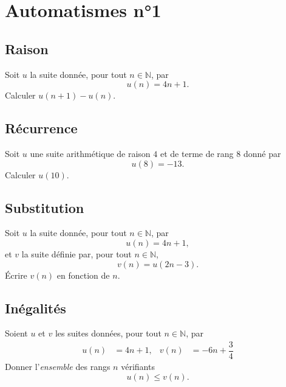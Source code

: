 \documentclass[14pt]{beamer}
\newcommand{\N}{\mathbb{N}}
\begin{document}
\section{Automatismes n°1}

\subsection{Raison}

\begin{frame}
	
	Soit $u$ la suite donnée, pour tout $n\in\N$, par
		\[ u(n) = 4n+1. \]
	Calculer $u(n+1) - u(n)$.

\end{frame}

\subsection{Récurrence}

\begin{frame}
	Soit $u$ une suite arithmétique de raison $4$ et de terme de rang $8$ donné par
		\[ u(8) = -13. \]
	Calculer $u(10)$.

\end{frame}

\subsection{Substitution}

\begin{frame}

	Soit $u$ la suite donnée, pour tout $n\in\N$, par
		\[ u(n) = 4n+1, \]
	et $v$ la suite définie par, pour tout $n\in\N$, 
		\[ v(n) = u(2n-3). \]
	Écrire $v(n)$ en fonction de $n$.	
\end{frame}

%
%

\subsection{Inégalités}

\begin{frame}

	Soient $u$ et $v$ les suites données, pour tout $n\in\N$, par
		\begin{align*}
			u(n) &= 4n+1, & v(n) &= -6n+\dfrac34
		\end{align*}
	Donner l'\emph{ensemble} des rangs $n$ vérifiants
		\[ u(n) \leq v(n). \]
\end{frame}
\end{document}

